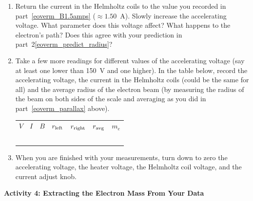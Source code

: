 \begin{enumerate}[labparts]
 \item Return the current in the Helmholtz coils to the value you recorded in 
part~\ref{eoverm_B1.5amps} ($\approx 1.50$~A). Slowly increase the accelerating voltage. What parameter 
does this voltage affect? What happens to the electron's path?  Does this agree with your prediction in part~2\ref{eoverm_predict_radius}?
\answerspace{0.5in}

\item Take a few more readings for different values of the accelerating voltage (say at least one lower than 150~V
 and one higher).  In the table below, record the accelerating voltage, the current in the 
Helmholtz coils (could be the same for all) 
and the average radius of the electron beam (by measuring the radius of the 
beam on both sides of the scale and averaging as you did in part~\ref{eoverm_parallax} above). 

\begin{center}
{\renewcommand{\arraystretch}{1.8}
\begin{tabular}{|*{7}{ C{0.75in} |}}
\hline
$V$ & $I$ & $B$ & $r_{\rm left}$ & $r_{\rm right}$ & $r_{\rm avg}$ & $m_e$  \\ 
\hhline{|=|=|=|=|=|=|=|}
& & & & & & \\ \hline
& & & & & & \\ \hline
& & & & & & \\ \hline
& & & & & & \\ \hline
& & & & & & \\ \hline
\end{tabular}
}
\end{center}

\item When you are finished with your measurements, turn down to zero the accelerating voltage, the 
heater voltage, the Helmholtz coil voltage, and the current adjust knob.

\end{enumerate}

\pagebreak[2]
\textbf{Activity 4: Extracting the Electron Mass From Your Data}

